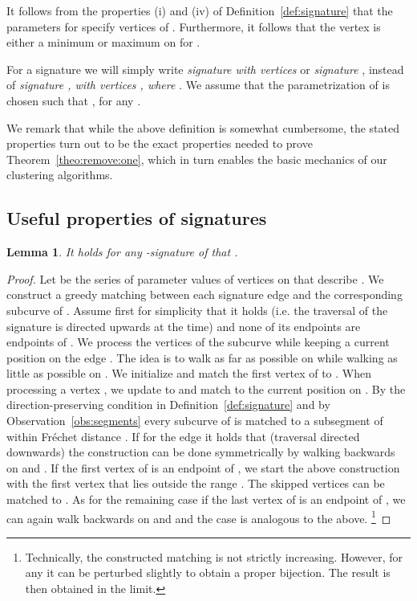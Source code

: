 \documentclass[11pt, letter]{article}
\newtheorem{lemma}[theorem]{Lemma}
\newcommand{\seclab}[1]{\label{sec:#1}}
\newcommand{\thmref}[1]{Theorem~\ref{theo:#1}}
\newcommand{\lemlab}[1]{\label{lemma:#1}}
\newcommand{\defref}[1]{Definition~\ref{def:#1}}
\newcommand{\obsref}[1]{Observation~\ref{obs:#1}}
\newcommand{\Frechet}{Fr\'echet\xspace}
\begin{document}
It follows from the properties (i) and (iv) of \defref{signature} that the parameters  for  specify vertices of . 
Furthermore, it follows that the vertex  is either a minimum or maximum on  for .

For a signature  we will simply write \emph{signature  with  vertices} or \emph{signature }, instead of \emph{signature , with vertices , where }. We assume that the parametrization of  is chosen such that , for any .

We remark that while the above definition is somewhat cumbersome, the stated
properties turn out to be the exact properties needed to prove
\thmref{remove:one}, which in turn enables the basic mechanics of our clustering
algorithms.

\subsection{Useful properties of signatures}
\seclab{properties:signatures}

\begin{lemma}\lemlab{fd:signature}
It holds for any -signature  of  that .
\end{lemma}


\begin{proof}
Let  be the series of parameter values of vertices on  that describe . We construct a greedy matching between each signature edge  and the corresponding subcurve  of . Assume first for simplicity that it holds  (i.e. the traversal of the signature is directed upwards at the time) and none of its endpoints are endpoints of . We process the vertices of the subcurve  while keeping a current position  on the edge . The idea is to walk as far as possible on  while walking as little as possible on . We initialize  and match the first vertex of  to . When processing a vertex , we update  to  and match  to the current position  on . By the direction-preserving condition in \defref{signature} and by \obsref{segments} every subcurve of  is matched to a subsegment of  within \Frechet distance . If for the edge  it holds that  (traversal directed downwards) the construction can be done symmetrically by walking backwards on  and . If the first vertex of  is an endpoint of , we start the above construction with the first vertex that lies outside the range . The skipped vertices can be matched to . As for the remaining case if the last vertex of  is an endpoint of , we can again walk backwards on  and  and the case is analogous to the above.
\footnote{
Technically, the constructed matching is not strictly increasing. However, for any  it can be perturbed slightly to obtain a proper bijection. The result is then obtained in the limit.
}
\end{proof}
\end{document}
